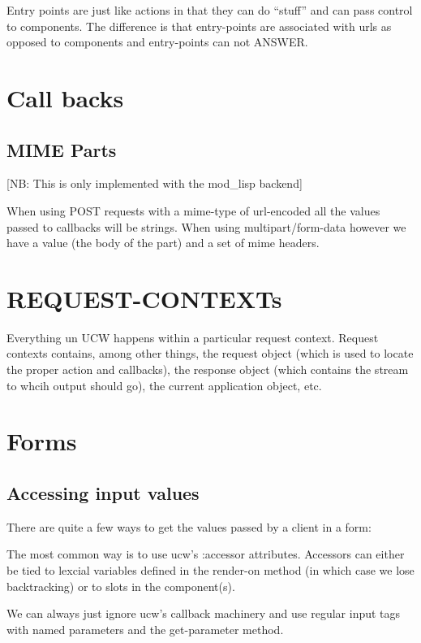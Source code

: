 \documentclass[a4paper]{article}
\newcommand{\ucw}{\textsc{UCW}}
\newcommand{\sym}[1]{\textsc{#1}}
\begin{document}
Entry points are just like actions in that they can do ``stuff'' and
can pass control to components. The difference is that entry-points
are associated with urls as opposed to components and entry-points can
not \sym{ANSWER}.

\section{Call backs}

\subsection{MIME Parts}

[NB: This is only implemented with the mod\_lisp backend]

When using POST requests with a mime-type of url-encoded all the
values passed to callbacks will be strings. When using
multipart/form-data however we have a value (the body of the part) and
a set of mime headers.

\section{REQUEST-CONTEXTs}

Everything un \ucw{} happens within a particular request
context. Request contexts contains, among other things, the request
object (which is used to locate the proper action and callbacks), the
response object (which contains the stream to whcih output should go),
the current application object, etc.

\section{Forms}

\subsection{Accessing input values}

There are quite a few ways to get the values passed by a client in a
form:

The most common way is to use ucw's :accessor attributes. Accessors
can either be tied to lexcial variables defined in the render-on
method (in which case we lose backtracking) or to slots in the
component(s).

We can always just ignore ucw's callback machinery and use regular
input tags with named parameters and the get-parameter method.
\end{document}
